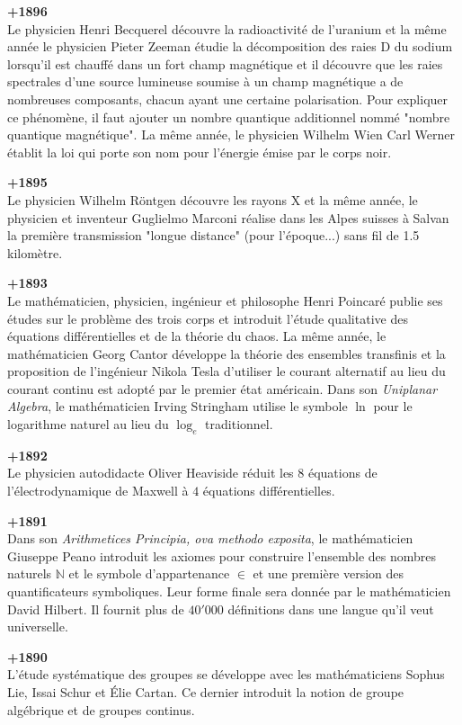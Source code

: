 \textbf{+1896}\\
Le physicien Henri Becquerel découvre la radioactivité de l'uranium et la même année le physicien Pieter Zeeman étudie la décomposition des raies D du sodium lorsqu'il est chauffé dans un fort champ magnétique et il découvre que les raies spectrales d'une source lumineuse soumise à un champ magnétique a de nombreuses composants, chacun ayant une certaine polarisation. Pour expliquer ce phénomène, il faut ajouter un nombre quantique additionnel nommé "nombre quantique magnétique". La même année, le physicien Wilhelm Wien Carl Werner établit la loi qui porte son nom pour l'énergie émise par le corps noir.

\textbf{+1895}\\
Le physicien Wilhelm Röntgen découvre les rayons X et la même année, le physicien et inventeur Guglielmo Marconi réalise dans les Alpes suisses à Salvan la première transmission "longue distance" (pour l'époque...) sans fil de 1.5 kilomètre.

\textbf{+1893}\\
Le mathématicien, physicien, ingénieur et philosophe Henri Poincaré publie ses études sur le problème des trois corps et introduit l'étude qualitative des équations différentielles et de la théorie du chaos. La même année, le mathématicien Georg Cantor développe la théorie des ensembles transfinis et la proposition de l'ingénieur Nikola Tesla d'utiliser le courant alternatif au lieu du courant continu est adopté par le premier état américain. Dans son \textit{Uniplanar Algebra}, le mathématicien Irving Stringham utilise le symbole $\ln$ pour le logarithme naturel au lieu du $\log_e$ traditionnel.

\textbf{+1892}\\
Le physicien autodidacte Oliver Heaviside réduit les $8$ équations de l'électrodynamique de Maxwell à $4$ équations différentielles.

\textbf{+1891}\\
Dans son \textit{Arithmetices Principia, ova methodo exposita}, le mathématicien Giuseppe Peano introduit les axiomes pour construire l'ensemble des nombres naturels $\mathbb{N}$ et le symbole d'appartenance $\in$ et une première version des quantificateurs symboliques. Leur forme finale sera donnée par le mathématicien David Hilbert. Il fournit plus de $40'000$ définitions dans une langue qu'il veut universelle.

\textbf{+1890}\\
L'étude systématique des groupes se développe avec les mathématiciens Sophus Lie, Issai Schur et Élie Cartan. Ce dernier introduit la notion de groupe algébrique et de groupes continus.

